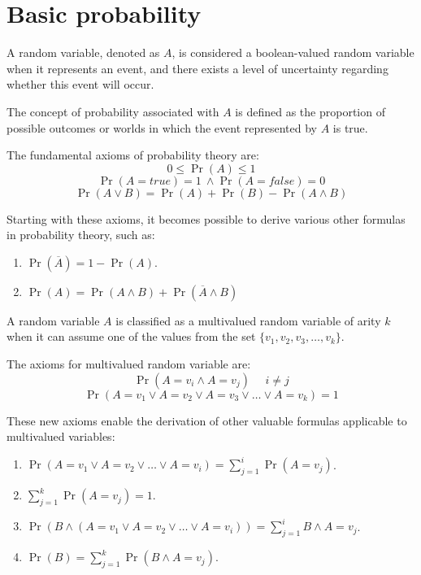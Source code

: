 \section{Basic probability}

\begin{definition}
    A random variable, denoted as $A$, is considered a boolean-valued random variable when it represents an event, and there exists a level of uncertainty regarding whether this event will occur.
\end{definition}
\begin{definition}
    The concept of probability associated with $A$ is defined as the proportion of possible outcomes or worlds in which the event represented by $A$ is true.    
\end{definition}
\begin{theorem}
    The fundamental axioms of probability theory are: 
    \[0 \leq \Pr(A) \leq 1\]
    \[\Pr(A=true) = 1 \: \land \Pr(A=false) = 0\]
    \[\Pr(A \lor B)=\Pr(A)+\Pr(B)-\Pr(A \land B)\]
\end{theorem}
Starting with these axioms, it becomes possible to derive various other formulas in probability theory, such as:
\begin{enumerate}
    \item $\Pr(\overline{A})=1-\Pr(A)$.
    \item $\Pr(A)=\Pr(A \land B)+\Pr(\overline{A} \land B)$
\end{enumerate}
\begin{definition}
    A random variable $A$ is classified as a multivalued random variable of arity $k$ when it can assume one of the values from the set $\{v_1, v_2, v_3, \dots, v_k\}$. 
\end{definition}
\begin{theorem}
    The axioms for multivalued random variable are: 
    \[\Pr(A=v_i \land A=v_j) \:\:\:\:\:\: i \neq j\]
    \[\Pr(A=v_1 \lor A=v_2 \lor A=v_3 \lor \dots \lor A=v_k)=1\]
\end{theorem}
These new axioms enable the derivation of other valuable formulas applicable to multivalued variables:    \begin{enumerate}
    \item $\Pr(A=v_1 \lor A=v_2 \lor \dots \lor A=v_i)=\sum_{j=1}^{i}{\Pr(A=v_j)}$.
    \item $\sum_{j=1}^{k}{\Pr(A=v_j)}=1$. 
    \item $\Pr(B \land (A=v_1 \lor A=v_2 \lor \dots \lor A=v_i))=\sum_{j=1}^{i}{B \land A=v_j}$. 
    \item $\Pr(B)=\sum_{j=1}^{k}{\Pr(B \land A=v_j)}$.
\end{enumerate}
